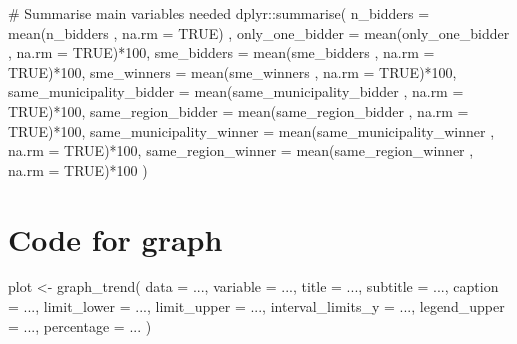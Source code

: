 \documentclass[
]{report}
\newenvironment{Shaded}{\begin{snugshade}}{\end{snugshade}}
\newcommand{\AttributeTok}[1]{\textcolor[rgb]{0.40,0.45,0.13}{#1}}
\newcommand{\CommentTok}[1]{\textcolor[rgb]{0.37,0.37,0.37}{#1}}
\newcommand{\ConstantTok}[1]{\textcolor[rgb]{0.56,0.35,0.01}{#1}}
\newcommand{\DecValTok}[1]{\textcolor[rgb]{0.68,0.00,0.00}{#1}}
\newcommand{\FunctionTok}[1]{\textcolor[rgb]{0.28,0.35,0.67}{#1}}
\newcommand{\NormalTok}[1]{\textcolor[rgb]{0.00,0.23,0.31}{#1}}
\newcommand{\OtherTok}[1]{\textcolor[rgb]{0.00,0.23,0.31}{#1}}
\newcommand{\SpecialCharTok}[1]{\textcolor[rgb]{0.37,0.37,0.37}{#1}}
\begin{document}
\begin{Shaded}
\begin{Highlighting}[]
  \CommentTok{\# Summarise main variables needed}
\NormalTok{  dplyr}\SpecialCharTok{::}\FunctionTok{summarise}\NormalTok{(}
    \AttributeTok{n\_bidders                =} \FunctionTok{mean}\NormalTok{(n\_bidders                , }\AttributeTok{na.rm =} \ConstantTok{TRUE}\NormalTok{)    ,}
    \AttributeTok{only\_one\_bidder          =} \FunctionTok{mean}\NormalTok{(only\_one\_bidder          , }\AttributeTok{na.rm =} \ConstantTok{TRUE}\NormalTok{)}\SpecialCharTok{*}\DecValTok{100}\NormalTok{,}
    \AttributeTok{sme\_bidders              =} \FunctionTok{mean}\NormalTok{(sme\_bidders              , }\AttributeTok{na.rm =} \ConstantTok{TRUE}\NormalTok{)}\SpecialCharTok{*}\DecValTok{100}\NormalTok{,}
    \AttributeTok{sme\_winners              =} \FunctionTok{mean}\NormalTok{(sme\_winners              , }\AttributeTok{na.rm =} \ConstantTok{TRUE}\NormalTok{)}\SpecialCharTok{*}\DecValTok{100}\NormalTok{,}
    \AttributeTok{same\_municipality\_bidder =} \FunctionTok{mean}\NormalTok{(same\_municipality\_bidder , }\AttributeTok{na.rm =} \ConstantTok{TRUE}\NormalTok{)}\SpecialCharTok{*}\DecValTok{100}\NormalTok{,}
    \AttributeTok{same\_region\_bidder       =} \FunctionTok{mean}\NormalTok{(same\_region\_bidder       , }\AttributeTok{na.rm =} \ConstantTok{TRUE}\NormalTok{)}\SpecialCharTok{*}\DecValTok{100}\NormalTok{,}
    \AttributeTok{same\_municipality\_winner =} \FunctionTok{mean}\NormalTok{(same\_municipality\_winner , }\AttributeTok{na.rm =} \ConstantTok{TRUE}\NormalTok{)}\SpecialCharTok{*}\DecValTok{100}\NormalTok{,}
    \AttributeTok{same\_region\_winner       =} \FunctionTok{mean}\NormalTok{(same\_region\_winner       , }\AttributeTok{na.rm =} \ConstantTok{TRUE}\NormalTok{)}\SpecialCharTok{*}\DecValTok{100}
\NormalTok{  ) }
\end{Highlighting}
\end{Shaded}

\hypertarget{code-for-graph}{%
\section{Code for graph}\label{code-for-graph}}

\begin{Shaded}
\begin{Highlighting}[]
\NormalTok{plot }\OtherTok{\textless{}{-}} \FunctionTok{graph\_trend}\NormalTok{(}
  \AttributeTok{data =}\NormalTok{ ..., }
  \AttributeTok{variable =}\NormalTok{ ..., }
  \AttributeTok{title =}\NormalTok{ ...,}
  \AttributeTok{subtitle =}\NormalTok{ ...,}
  \AttributeTok{caption =}\NormalTok{ ...,}
  \AttributeTok{limit\_lower =}\NormalTok{ ...,}
  \AttributeTok{limit\_upper =}\NormalTok{ ...,}
  \AttributeTok{interval\_limits\_y =}\NormalTok{ ...,}
  \AttributeTok{legend\_upper =}\NormalTok{ ...,}
  \AttributeTok{percentage =}\NormalTok{ ...}
\NormalTok{)}
\end{Highlighting}
\end{Shaded}
\end{document}
